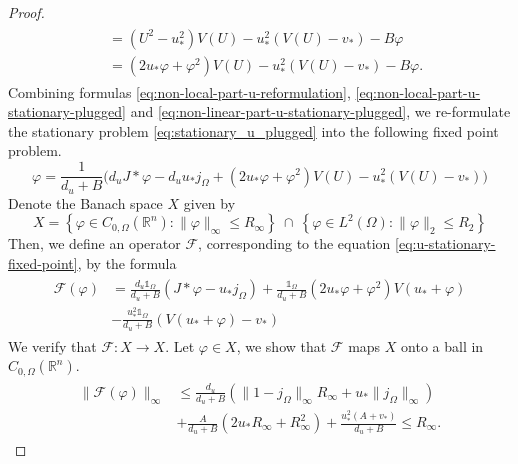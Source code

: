 \documentclass[12pt, a4paper]{article}
\theoremstyle{break}
\theoremstyle{break}
\theoremstyle{break}
\theoremstyle{break}
\theoremstyle{break}
\theoremstyle{break}
\theoremstyle{break}
\begin{document}
\begin{proof}
\begin{align}
\begin{split}
            &= (U^2 - u_*^2)V(U) - u_*^2(V(U) - v_*) - B \varphi \\
            &= (2 u_* \varphi + \varphi^2) V(U) - u_*^2(V(U) - v_*) - B \varphi.
        \end{split}
    \end{align}
    Combining formulas \eqref{eq:non-local-part-u-reformulation}, \eqref{eq:non-local-part-u-stationary-plugged} and \eqref{eq:non-linear-part-u-stationary-plugged}, we re-formulate the stationary problem \eqref{eq:stationary_u_plugged} into the following fixed point problem.
    \begin{equation}
        \label{eq:u-stationary-fixed-point}
        \varphi = \frac{1}{d_u + B}\Big(d_u J *\varphi - d_u u_* j_\Omega + (2 u_* \varphi + \varphi^2) V(U) - u_*^2(V(U) - v_*)\Big)
    \end{equation}
    Denote the Banach space $X$ given by
    \begin{equation}
        X = \left\{ \varphi \in C_{0,\Omega}(\mathbb{R}^n): \|\varphi\|_\infty \leq R_\infty \right\} \:\cap\: \left\{ \varphi \in L^2(\Omega): \|\varphi\|_2 \leq R_2 \right\}
    \end{equation}
    Then, we define an operator $\mathcal{F}$, corresponding to the equation \eqref{eq:u-stationary-fixed-point}, by the formula
    \begin{align}
        \label{eq:operator-f-def}
        \begin{split}
            \mathcal{F}(\varphi) 
            &= 
            \frac{d_u \mathds{1}_{\Omega}}{d_u + B}\left( J *\varphi - u_* j_\Omega\right) + \frac{\mathds{1}_{\Omega}}{d_u + B}(2 u_* \varphi + \varphi^2) V (u_* + \varphi)\\
            &- \frac{u_*^2\mathds{1}_{\Omega}}{d_u + B}(V(u_* + \varphi) - v_*)        
        \end{split}
    \end{align}
    We verify that $\mathcal{F}: X \rightarrow X$. Let $\varphi \in X$, we show that $\mathcal{F}$ maps $X$ onto a ball in $C_{0, \Omega}(\mathbb{R}^n)$.
    \begin{align}
        \label{eq:f_ball_to_ball_infty_1}
        \begin{split}
            \|\mathcal{F}(\varphi)\|_{\infty}
            &\leq
            \frac{d_u }{d_u + B} \left( \|1 -j_\Omega\|_\infty R_\infty + u_*\|j_\Omega\|_\infty\right) \\
            &+
            \frac{A}{d_u + B}\left( 2 u_* R_\infty + R^2_\infty \right) 
            + \frac{u_*^2 (A + v_*)}{d_u + B} \leq R_\infty.

\end{split}
\end{align}
\end{proof}
\end{document}
